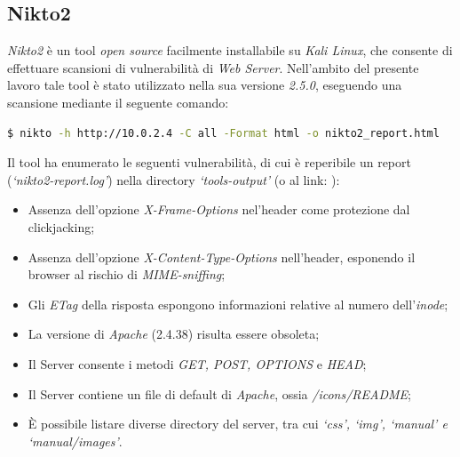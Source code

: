 \subsection{Nikto2}
\emph{Nikto2} è un tool \emph{open source} facilmente installabile su \emph{Kali Linux}, che consente di effettuare scansioni di vulnerabilità di \emph{Web Server}. Nell'ambito del presente lavoro tale tool è stato utilizzato nella sua versione \emph{2.5.0}, eseguendo una scansione mediante il seguente comando:
\begin{lstlisting}[language=bash]
    $ nikto -h http://10.0.2.4 -C all -Format html -o nikto2_report.html
\end{lstlisting}
Il tool ha enumerato le seguenti vulnerabilità, di cui è reperibile un report (\emph{`nikto2-report.log'}) nella directory \emph{`tools-output'} (o al link: ):
\begin{itemize}
    \item Assenza dell'opzione \emph{X-Frame-Options} nel'header come protezione dal clickjacking;
    \item Assenza dell'opzione \emph{X-Content-Type-Options} nell'header, esponendo il browser al rischio di \emph{MIME-sniffing};
    \item Gli \emph{ETag} della risposta espongono informazioni relative al numero dell'\emph{inode};
    \item La versione di \emph{Apache} (2.4.38) risulta essere obsoleta;
    \item Il Server consente i metodi \emph{GET, POST, OPTIONS} e \emph{HEAD};
    \item Il Server contiene un file di default di \emph{Apache}, ossia \emph{/icons/README};
    \item È possibile listare diverse directory del server, tra cui \emph{`css', `img', `manual' e `manual/images'}.
\end{itemize}
